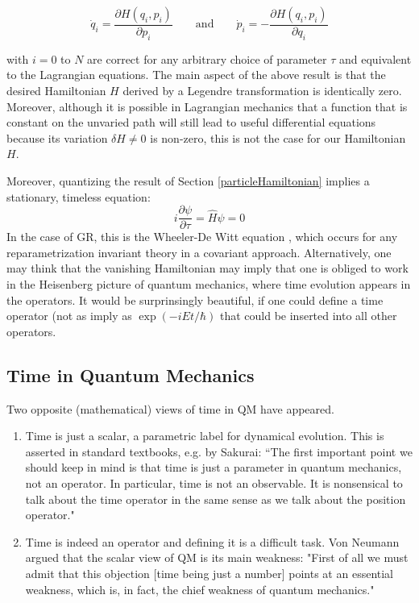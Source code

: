\documentclass[a4paper,10pt]{article}
\numberwithin{equation}{section}
\begin{document}
\begin{equation}
    \dot{q}_i = \frac{\partial H(q_i,p_i) }{\partial p_i} \qquad \text{and} \qquad  \dot{p}_i = - \frac{\partial H(q_i,p_i) }{\partial q_i}
\end{equation}

with $i = 0$ to $N$ are correct for any arbitrary choice of parameter $\tau$ and equivalent to the Lagrangian equations. The main aspect of the above result is that the desired Hamiltonian $H$ derived by a Legendre transformation is identically zero. Moreover, although it is possible in Lagrangian mechanics that a function that is constant on the unvaried path will still lead to useful differential equations because its variation $\delta H \neq 0$ is non-zero, this is not the case for our Hamiltonian $H$.

Moreover, quantizing the result of Section \ref{particleHamiltonian} implies a stationary, timeless equation:
\begin{equation}
    i \frac{\partial \psi}{\partial \tau} = \hat{H} \psi = 0
\end{equation}
In the case of GR, this is the Wheeler-De Witt equation \cite{WdWeq}, which occurs for any reparametrization invariant theory in a covariant approach. Alternatively, one may think that the vanishing Hamiltonian may imply that one is obliged to work in the Heisenberg picture of quantum mechanics, where time evolution appears in the operators. It would be surprinsingly beautiful, if one could define a time operator (not as imply as $\exp{( -iEt/\hbar)}$ that could be inserted into all other operators.



\subsection{Time in Quantum Mechanics}
Two opposite (mathematical) views of time in QM have appeared.  

\begin{enumerate}
    \item 
    Time is just a scalar, a parametric label for dynamical evolution. This is asserted in standard textbooks, e.g. by Sakurai: “The first important point we should keep in mind is that time is just a parameter in quantum mechanics, not an operator. In particular, time is not an observable. It is nonsensical to talk about the time operator in the same sense as we talk about the position operator." \cite{SakuraiQM}
    
    \item
   Time is indeed an operator and defining it is a difficult task. Von Neumann argued that the scalar view of QM is its main weakness: "First of all we must admit that this objection [time being just a number] points at an essential weakness, which is, in fact, the chief weakness of quantum mechanics." \cite{NeumannQM}
\end{enumerate}
\end{document}
